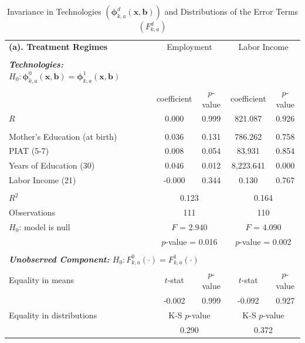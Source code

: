 \begin{table}[!htpb]
\begin{threeparttable}
\caption{Invariance in Technologies $ \left( \bm{\phi}_{k,a}^d \left( \bm{x}, \bm{b} \right) \right) $ and Distributions of the  Error Terms $\left( F_{k,a}^d \right) $} \label{table:invariance}
\centering
\footnotesize
\begin{tabular}{lcccc} \toprule
 \multicolumn{1}{l}{\textbf{(a). Treatment Regimes}} & \multicolumn{2}{c}{Employment} &   \multicolumn{2}{c}{Labor Income} \\ \\
 \textbf{\textit{Technologies:} $H_0: \bm{\phi}_{k,a}^0 \left( \bm{x}, \bm{b} \right) = \bm{\phi}_{k,a}^1 \left( \bm{x}, \bm{b} \right)$}      \\
       			      & coefficient & $p$-value & coefficient & $p$-value \\
$R$ &0.000 & 0.999 & 821.087 & 0.926 \\ \\
Mother's Education (at birth) & 0.036 & 0.131 & 786.262 & 0.758 \\
PIAT (5-7) & 0.008 & 0.054 & 83.931 & 0.854 \\
Years of Education (30) & 0.046 & 0.012 & 8,223.641 & 0.000 \\
Labor Income (21) & -0.000 & 0.344 & 0.130 & 0.767 \\ \\
$R^2$ & \multicolumn{2}{c}{0.123}  & \multicolumn{2}{c}{0.164}  \\
Observations & \multicolumn{2}{c}{111} & \multicolumn{2}{c}{110} \\
$H_0$: model is null & \multicolumn{2}{c}{$F$ = 2.940} & \multicolumn{2}{c}{$F$ = 4.090} \\
& \multicolumn{2}{c}{$p$-value = 0.016} & \multicolumn{2}{c}{$p$-value = 0.002} \\ \\
 \multicolumn{5}{l}{\textbf{\textit{Unobserved Component:} $H_0:  F_{k,a}^0 \left( \cdot \right) =  F_{k,a}^1 \left( \cdot \right)$}} \\
Equality in means & $t$-stat & $p$-value & $t$-stat & $p$-value \\
 & -0.002  & 0.999 & -0.092 & 0.927   \\
Equality in distributions & \multicolumn{2}{c}{K-S $p$-value} &  \multicolumn{2}{c}{K-S $p$-value}  \\
                                      & \multicolumn{2}{c}{0.290} &  \multicolumn{2}{c}{0.372}  \\ \midrule

\end{tabular}
\end{threeparttable}
\end{table}
